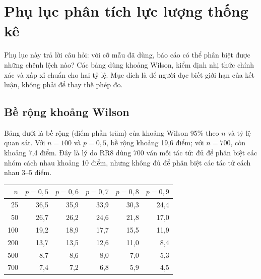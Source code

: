 \chapter{Phụ lục phân tích lực lượng thống kê}

\label{app:thong-ke}

Phụ lục này trả lời câu hỏi: với cỡ mẫu đã dùng, báo cáo có thể phân biệt được những chênh lệch nào? Các bảng dùng khoảng Wilson, kiểm định nhị thức chính xác và xấp xỉ chuẩn cho hai tỷ lệ. Mục đích là để người đọc biết giới hạn của kết luận, không phải để thay thế phép đo.

\section{Bề rộng khoảng Wilson}

Bảng dưới là bề rộng (điểm phần trăm) của khoảng Wilson 95\% theo $n$ và tỷ lệ quan sát. Với $n=100$ và $p=0{,}5$, bề rộng khoảng 19,6 điểm; với $n=700$, còn khoảng 7,4 điểm. Đây là lý do RR8 dùng 700 ván mỗi tác tử: đủ để phân biệt các nhóm cách nhau khoảng 10 điểm, nhưng không đủ để phân biệt các tác tử cách nhau 3--5 điểm.

\begin{center}\small

\begin{tabular}{@{}rrrrrr@{}}

\toprule

$n$ & $p=0,5$ & $p=0,6$ & $p=0,7$ & $p=0,8$ & $p=0,9$ \\

\midrule

25 & 36,5 & 35,9 & 33,9 & 30,3 & 24,4 \\

50 & 26,7 & 26,2 & 24,6 & 21,8 & 17,0 \\

100 & 19,2 & 18,9 & 17,7 & 15,5 & 11,9 \\

200 & 13,7 & 13,5 & 12,6 & 11,0 & 8,4 \\

500 & 8,7 & 8,6 & 8,0 & 7,0 & 5,3 \\

700 & 7,4 & 7,2 & 6,8 & 5,9 & 4,5 \\

\bottomrule

\end{tabular}

\end{center}

